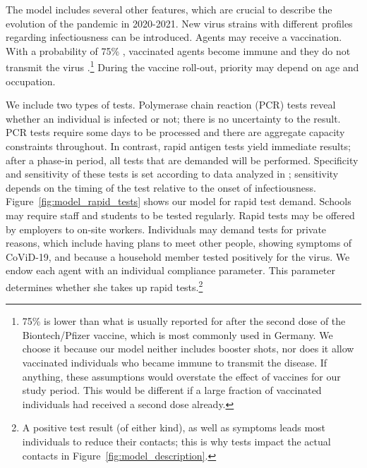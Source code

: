 The model includes several other features, which are crucial to describe the evolution of
the pandemic in 2020-2021. New virus strains with different profiles regarding
infectiousness can be introduced. Agents may receive a
vaccination. With a probability of 75\% \citep{Hunter2021}, vaccinated agents become
immune and they do not transmit the virus \citep{Petter2021, LevineTiefenbrun2021,
Pritchard2021}.\footnote{75\% is lower than what is usually reported for after the second
dose of the Biontech/Pfizer vaccine, which is most commonly used in Germany. We choose it
because our model neither includes booster shots, nor does it allow vaccinated
individuals who became immune to transmit the disease\citep{Petter2021,
LevineTiefenbrun2021, Pritchard2021}. If anything, these assumptions would overstate the
effect of vaccines for our study period. This would be different if a large fraction of
vaccinated individuals had received a second dose already.} During the vaccine roll-out,
priority may depend on age and occupation.

We include two types of tests. Polymerase chain reaction (PCR) tests reveal whether an
individual is infected or not; there is no uncertainty to the result. PCR tests require
some days to be processed and
there are aggregate capacity constraints throughout. In contrast, rapid antigen tests
yield immediate results; after a phase-in period, all tests that are demanded will be
performed. Specificity and
sensitivity of these tests is set
according to data analyzed in \cite{Bruemmer2021, Smith2021}; sensitivity depends on the
timing of the test relative to the onset of infectiousness.
Figure~\ref{fig:model_rapid_tests} shows our model for rapid test demand. Schools may
require staff and students to be tested regularly. Rapid tests may be offered by employers to on-site workers. Individuals may demand
tests for private reasons, which include having plans to meet other people, showing
symptoms of CoViD-19, and because a household member tested positively for the virus. We
endow each agent with an individual compliance parameter. This parameter determines
whether she takes up rapid tests.\footnote{A positive test result (of either kind), as
well as symptoms leads most individuals to reduce their contacts; this is why tests
impact the actual contacts in Figure~\ref{fig:model_description}.}

